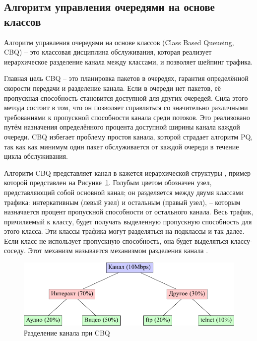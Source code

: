     \subsection{Алгоритм управления очередями на основе классов}

        Алгоритм управления очередями на основе классов (Class Based Queueing, CBQ) -- это
        классовая дисциплина обслуживания, которая реализует
        иерархическое разделение канала между классами, и позволяет
        шейпинг трафика. \cite{tccbq}

        Главная цель CBQ -- это планировка пакетов в очередях, гарантия определённой
        скорости передачи и разделение канала. Если в очереди нет пакетов, её
        пропускная способность становится доступной для других очередей. Сила
        этого метода состоит в том, что он позволяет справляться со значительно
        различными требованиями к пропускной способности канала среди потоков. Это
        реализовано путём назначения определённого процента доступной ширины
        канала каждой очереди. CBQ избегает проблему простоя канала, которой страдает
        алгоритм PQ, так как как минимум один пакет обслуживается от каждой очереди
        в течение цикла обслуживания.\cite{packethandling}

		Алгоритм CBQ представляет канал в кажется иерархической структуры \cite{linksharing},
		пример которой представлен на Рисунке~\ref{pic:cbq}. Голубым цветом обозначен узел,
		представляющий собой основной канал; он разделяется между двумя классами трафика:
		интеркативным (левый узел) и остальным (правый узел), -- которым назначается процент
		пропускной способности от остального канала. Весь трафик, причиляемый к классу,
		будет получать выделенную пропускную способность для этого класса. Эти
		классы трафика могут разделяться на подклассы и так далее. Если класс не использует
		пропускную способность, она будет выделяться классу-соседу. Этот механизм
		называется механизмом разделения канала \cite{linksharing}. 

        \begin{figure}[ht!]
			\center
            \includegraphics[scale=1.2]{./pdfimages/cbq.pdf}
            \caption{Разделение канала при CBQ}
			\label{pic:cbq}
        \end{figure}

